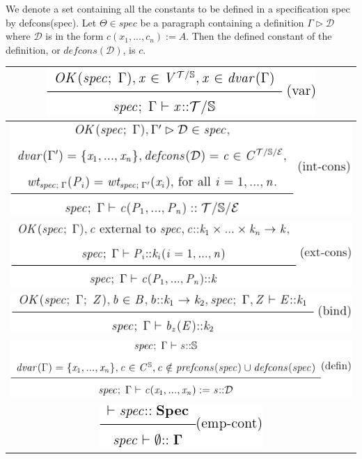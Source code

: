 \begin{defin} We denote a set containing all the constants to be defined in a
specification spec by defcons(spec). Let $\Theta \in spec$ be a paragraph
containing a definition $\Gamma \triangleright \mathcal{D}$ where $\mathcal{D}$
is in the form $c(x_{1},...,c_{n}):=A$. Then the defined constant of the
definition, or $defcons(\mathcal{D})$, is $c$.
\end{defin}

\begin{table}
    \begin{tabular}{|c|} \hline 
        \includegraphics[scale=0.7]{Figures/zcga/1.png} \\
        \hline
        \includegraphics[scale=0.7]{Figures/zcga/2.png} \\
        \hline
        \includegraphics[scale=0.7]{Figures/zcga/3.png} \\
        \hline
        \includegraphics[scale=0.7]{Figures/zcga/4.png} \\
        \hline
        \includegraphics[scale=0.7]{Figures/zcga/5.png} \\
        \hline
        \includegraphics[scale=0.7]{Figures/zcga/6.png} \\

\end{tabular}
\end{table}
